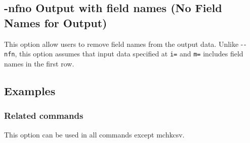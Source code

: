 %

\subsection{-nfno Output with field names (No Field Names for Output)\label{sect:option_nfno}}
This option allow users to remove field names from the output data.
Unlike -\verb|-nfn|, this option assumes that input data specified at \verb|i=| and \verb|m=| includes field names in the first row. 

\subsection*{Examples}


\subsubsection*{Related commands}
This option can be used in all commands except mchkcsv.
 
%

